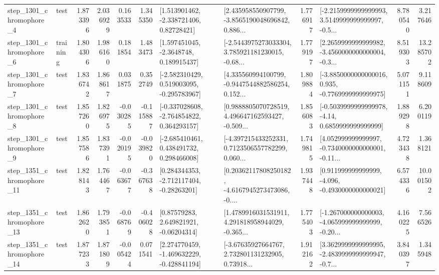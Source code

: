 \begin{tabular}{llrrrrllrlrr}
  step\_1301\_chromophore\_4 &      test &      1.873396 &    2.036929 &      0.163533 &  1.345350 &     [1.513901462, -2.338721406, 0.82728421] &  [2.435958550907799, -3.8565190048696842, 0.886... &       1.776917 &  [-2.2159999999999993, 3.5149999999999997, -0.5... &            8.780540 &          3.217646 \\
  step\_1301\_chromophore\_6 &  training &      1.804306 &    1.986160 &      0.181854 &  1.483473 &      [1.597451045, -2.3648748, 0.189915437] &  [-2.5443975273033304, 3.785921181230015, -0.68... &       1.779197 &  [2.2659999999999982, -3.4560000000000004, -0.3... &            8.519303 &         13.285702 \\
  step\_1301\_chromophore\_7 &      test &      1.836742 &    1.868617 &      0.031875 &  0.352749 &   [-2.582310429, 0.519003095, -0.295783967] &  [4.335560994100799, -0.9447544882586254, 0.152... &       1.809884 &  [-3.8850000000000016, 0.935, -0.7769999999999975] &            5.071151 &          9.118609 \\
  step\_1301\_chromophore\_8 &      test &      1.857260 &    1.826975 &     -0.030285 & -0.115887 &   [-0.337028608, -2.764854822, 0.364293157] &  [0.9888805070728519, 4.496647162593427, -0.509... &       1.856083 &   [-0.5039999999999978, -4.14, 0.6859999999999999] &            1.889298 &          6.200119 \\
  step\_1301\_chromophore\_9 &      test &      1.857586 &    1.837391 &     -0.020195 & -0.039820 &    [-2.685410461, 0.438491732, 0.298466008] &  [-4.397215433252331, 0.7123506557782299, 0.060... &       1.749815 &  [4.052999999999997, -0.7340000000000001, -0.11... &            4.723438 &          1.368121 \\
 step\_1351\_chromophore\_11 &      test &      1.828143 &    1.764467 &     -0.063677 & -0.367638 &    [0.284344353, -2.712117404, -0.28263201] &  [0.20362117808250182, -4.6167945273473086, -0.... &       1.937448 &   [0.911999999999999, -4.096, -0.4930000000000021] &            6.574336 &         10.001502 \\
 step\_1351\_chromophore\_13 &      test &      1.862620 &    1.793851 &     -0.068769 & -0.406028 &      [0.87579283, 2.649821921, -0.06204314] &  [1.4789916031531911, 4.291818958944029, -0.365... &       1.775403 &  [-1.267000000000003, -4.065999999999999, -0.20... &            4.160225 &          7.566526 \\
 step\_1351\_chromophore\_14 &      test &      1.877233 &    1.871809 &     -0.005424 &  0.071541 &   [2.274770459, -1.469632229, -0.428841194] &  [-3.67635927664767, 2.732801131232905, 0.73918... &       1.912162 &  [3.3629999999999995, -2.4839999999999947, -0.7... &            3.840397 &          1.345948 \\

\end{tabular}
